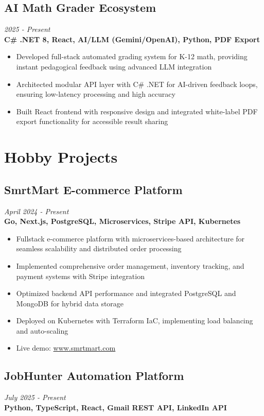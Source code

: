 \documentclass[11pt,a4paper]{article}
\begin{document}
\subsection*{AI Math Grader Ecosystem}
\textit{2025 - Present} \\
\textbf{C\# .NET 8, React, AI/LLM (Gemini/OpenAI), Python, PDF Export}

\begin{itemize}[leftmargin=*, itemsep=2pt]
\item Developed full-stack automated grading system for K-12 math, providing instant pedagogical feedback using advanced LLM integration
\item Architected modular API layer with C\# .NET for AI-driven feedback loops, ensuring low-latency processing and high accuracy
\item Built React frontend with responsive design and integrated white-label PDF export functionality for accessible result sharing
\end{itemize}

\section*{Hobby Projects}

\subsection*{SmrtMart E-commerce Platform}
\textit{April 2024 - Present} \\
\textbf{Go, Next.js, PostgreSQL, Microservices, Stripe API, Kubernetes}

\begin{itemize}[leftmargin=*, itemsep=2pt]
\item Fullstack e-commerce platform with microservices-based architecture for seamless scalability and distributed order processing
\item Implemented comprehensive order management, inventory tracking, and payment systems with Stripe integration
\item Optimized backend API performance and integrated PostgreSQL and MongoDB for hybrid data storage
\item Deployed on Kubernetes with Terraform IaC, implementing load balancing and auto-scaling
\item Live demo: \href{https://www.smrtmart.com}{www.smrtmart.com}
\end{itemize}

\subsection*{JobHunter Automation Platform}
\textit{July 2025 - Present} \\
\textbf{Python, TypeScript, React, Gmail REST API, LinkedIn API}
\end{document}

